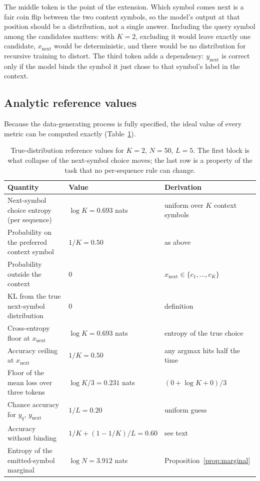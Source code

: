 \documentclass[11pt,a4paper]{article}
\newcommand{\xnext}{x_{\mathrm{next}}}
\newcommand{\ynext}{y_{\mathrm{next}}}
\newcommand{\yq}{y_{q}}
\begin{document}
The middle token is the point of the extension. Which symbol comes next is a
fair coin flip between the two context symbols, so the model's output at that
position should be a distribution, not a single answer. Including the query
symbol among the candidates matters: with $K=2$, excluding it would leave
exactly one candidate, $\xnext$ would be deterministic, and there would be no
distribution for recursive training to distort. The third token adds a
dependency: $\ynext$ is correct only if the model binds the symbol it just
chose to that symbol's label in the context.

\subsection{Analytic reference values}\label{sec:reference}
Because the data-generating process is fully specified, the ideal value of
every metric can be computed exactly (Table~\ref{tab:reference}).

\begin{table}[htbp]
\centering
\small
\caption{True-distribution reference values for $K=2$, $N=50$, $L=5$. The
first block is what collapse of the next-symbol choice moves; the last row is
a property of the task that no per-sequence rule can change.}
\label{tab:reference}
\begin{tabularx}{\linewidth}{Xll}
\toprule
Quantity & Value & Derivation\\
\midrule
Next-symbol choice entropy (per sequence) & $\log K = 0.693$ nats & uniform over $K$ context symbols\\
Probability on the preferred context symbol & $1/K = 0.50$ & as above\\
Probability outside the context & $0$ & $\xnext\in\{c_1,\dots,c_K\}$\\
KL from the true next-symbol distribution & $0$ & definition\\
\midrule
Cross-entropy floor at $\xnext$ & $\log K = 0.693$ nats & entropy of the true choice\\
Accuracy ceiling at $\xnext$ & $1/K = 0.50$ & any argmax hits half the time\\
Floor of the mean loss over three tokens & $\log K/3 = 0.231$ nats & $(0+\log K+0)/3$\\
\midrule
Chance accuracy for $\yq$, $\ynext$ & $1/L = 0.20$ & uniform guess\\
Accuracy without binding & $1/K+(1-1/K)/L = 0.60$ & see text\\
\midrule
Entropy of the emitted-symbol marginal & $\log N = 3.912$ nats & Proposition~\ref{prop:marginal}\\
\bottomrule
\end{tabularx}
\end{table}
\end{document}

